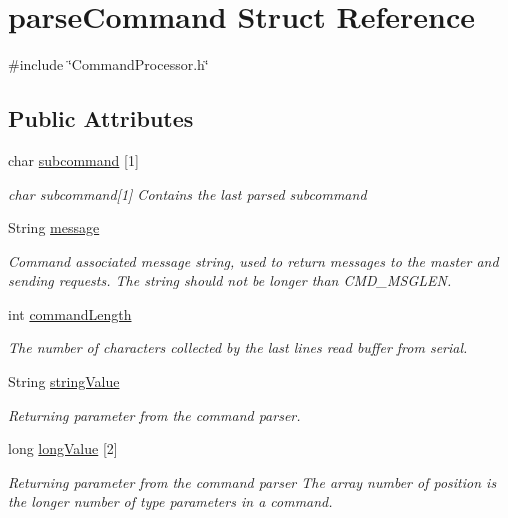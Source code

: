 \hypertarget{structparse_command}{\section{parse\-Command Struct Reference}
\label{structparse_command}
}


{\ttfamily \#include \char`\"{}Command\-Processor.\-h\char`\"{}}

\subsection*{Public Attributes}
\begin{DoxyCompactItemize}
\item 
char \hyperlink{structparse_command_a10312bf6b72a9315a4fb550458bc3ae9}{subcommand} \mbox{[}1\mbox{]}
\begin{DoxyCompactList}\small\item\em char subcommand\mbox{[}1\mbox{]} Contains the last parsed subcommand \end{DoxyCompactList}\item 
String \hyperlink{structparse_command_a5d2f84606922f34ad6a8ca5f7d8a59b5}{message}
\begin{DoxyCompactList}\small\item\em Command associated message string, used to return messages to the master and sending requests. The string should not be longer than C\-M\-D\-\_\-\-M\-S\-G\-L\-E\-N. \end{DoxyCompactList}\item 
int \hyperlink{structparse_command_a8359e121af4d2f16e054ead0b7844a30}{command\-Length}
\begin{DoxyCompactList}\small\item\em The number of characters collected by the last lines read buffer from serial. \end{DoxyCompactList}\item 
String \hyperlink{structparse_command_ac5ece0b161e3fae794d08911247c0b1e}{string\-Value}
\begin{DoxyCompactList}\small\item\em Returning parameter from the command parser. \end{DoxyCompactList}\item 
long \hyperlink{structparse_command_a10deac33dc255dd8a8b84532bbeb6c42}{long\-Value} \mbox{[}2\mbox{]}
\begin{DoxyCompactList}\small\item\em Returning parameter from the command parser The array number of position is the longer number of type parameters in a command. \end{DoxyCompactList}\item 

\end{DoxyCompactItemize}
